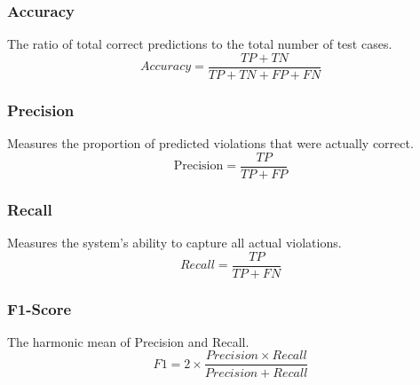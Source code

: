\documentclass[conference]{IEEEtran}
\begin{document}
\subsubsection{Accuracy}
The ratio of total correct predictions to the total number of test cases.
$$Accuracy = \frac{TP + TN}{TP + TN + FP + FN}$$
\subsubsection{Precision}
Measures the proportion of predicted violations that were actually correct.
$$\text{Precision} = \frac{TP}{TP + FP}$$
\subsubsection{Recall}
Measures the system's ability to capture all actual violations.
$$Recall = \frac{TP}{TP + FN}$$
\subsubsection{F1-Score}
The harmonic mean of Precision and Recall.
$$F1 = 2 \times \frac{Precision \times Recall}{Precision + Recall}$$


  
\end{document}
